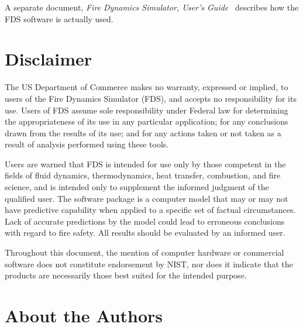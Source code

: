 \documentclass[11pt]{book}
\begin{document}
A separate document, {\em Fire Dynamics Simulator, User's Guide}~\cite{FDS_Users_Guide_5} describes how the FDS software is
actually used.


\chapter{Disclaimer}

The US Department of Commerce makes no warranty, expressed or implied,
to users of the Fire Dynamics Simulator (FDS), and accepts no responsibility for its use.
Users of FDS assume sole responsibility under Federal law for determining
the appropriateness of its use in any particular application;
for any conclusions drawn from the results of its use; and for any
actions taken or not taken as a result of analysis performed using these tools.

Users are warned that FDS is intended for use only by those competent
in the fields of fluid dynamics, thermodynamics, heat transfer, combustion, and fire science,
and is intended only to supplement the informed judgment of the qualified user.
The software package is a computer model that may or may not have predictive
capability when applied to a specific set of factual circumstances.
Lack of accurate predictions by the model could lead to erroneous
conclusions with regard to fire safety. All results should be evaluated by an informed user.

Throughout this document, the mention of computer hardware or commercial
software does not constitute endorsement by NIST, nor does it indicate that
the products are necessarily those best suited for the intended purpose.


\chapter{About the Authors}
\end{document}
